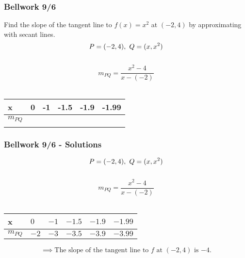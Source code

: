 \documentclass[12pt]{beamer}
\begin{document}
\begin{frame}
	\frametitle{Bellwork 9/6}
	\vspace*{\fill}
	\vspace*{\fill}
	\initclock
	Find the slope of the tangent line to $f(x)=x^2$ at $(-2,4)$ by approximating with secant lines.\\
	\vspace*{\fill}
	\[P = (-2, 4),\hspace{0.125cm}Q = (x, x^2)\]\\
	\[m_{PQ}=\frac{x^2-4}{x-(-2)}\]\\
	\begin{table}[]
		\begin{tabular}{l|l|l|l|l|l}
			\quad x  & \hspace{5px} 0 \hspace{5px} & -1 \quad & -1.5 \quad & -1.9 \quad & -1.99 \quad \\ \hline
			$m_{PQ}$ &                             &          &            &            &             \\
			         &                             &          &            &            &
		\end{tabular}
	\end{table}
	\vspace*{\fill}
	\vspace*{\fill}
	\crono
\end{frame}
\begin{frame}
	\frametitle{Bellwork 9/6 - Solutions}
	\vspace*{\fill}
	\[P = (-2, 4),\hspace{0.125cm}Q = (x, x^2)\]\\
	\[m_{PQ}=\frac{x^2-4}{x-(-2)}\]\\
	\begin{table}[]
		\begin{tabular}{l|l|l|l|l|l}
			\quad x  & \hspace{5px} $0$ \hspace{5px} & $-1$ \quad & $-1.5$ \quad & $-1.9$ \quad & $-1.99$ \quad \\ \hline
			$m_{PQ}$ & $-2$                          & $-3$       & $-3.5$       & $-3.9$       & $-3.99$
		\end{tabular}
	\end{table}
	\vspace*{\fill}
	\vspace*{\fill}
	\[\implies \text{The slope of the tangent line to $f$ at $(-2, 4)$ is $\boxed{-4}$.}\]
	\vspace*{\fill}
	\vspace*{\fill}
\end{frame}
\end{document}
